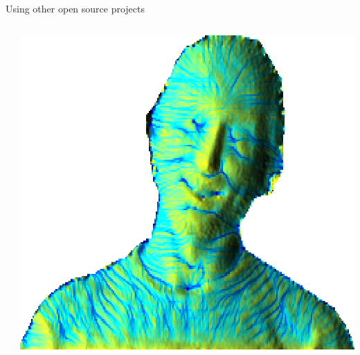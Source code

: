 \documentclass[xcolor={dvipsnames,usenames},beamer,aspectratio=169]{beamer}
\begin{document}
\begin{frame}{Using other open source projects}
\begin{columns}
\begin{column}{0.5\textwidth}
\begin{columns}
\begin{column}{0.2\textwidth}
\end{column}
\end{columns}

\end{column}
\begin{column}{0.45\textwidth}

\begin{center}
  \includegraphics[width=\textwidth]{tangible/face}
\end{center}

\end{column}
\end{columns}

\end{frame}
\end{document}
